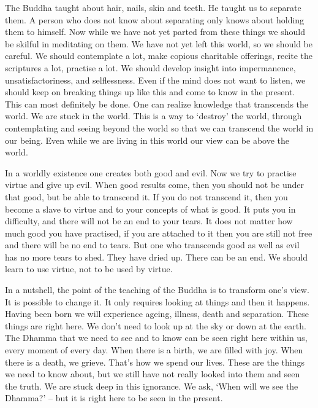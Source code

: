 The Buddha taught about hair, nails, skin and teeth. He taught us to separate them. A person who does not know about separating only knows about holding them to himself. Now while we have not yet parted from these things we should be skilful in meditating on them. We have not yet left this world, so we should be careful. We should contemplate a lot, make copious charitable offerings, recite the scriptures a lot, practise a lot. We should develop insight into impermanence, unsatisfactoriness, and selflessness. Even if the mind does not want to listen, we should keep on breaking things up like this and come to know in the present. This can most definitely be done. One can realize knowledge that transcends the world. We are stuck in the world. This is a way to `destroy' the world, through contemplating and seeing beyond the world so that we can transcend the world in our being. Even while we are living in this world our view can be above the world. 

In a worldly existence one creates both good and evil. Now we try to practise virtue and give up evil. When good results come, then you should not be under that good, but be able to transcend it. If you do not transcend it, then you become a slave to virtue and to your concepts of what is good. It puts you in difficulty, and there will not be an end to your tears. It does not matter how much good you have practised, if you are attached to it then you are still not free and there will be no end to tears. But one who transcends good as well as evil has no more tears to shed. They have dried up. There can be an end. We should learn to use virtue, not to be used by virtue. 

In a nutshell, the point of the teaching of the Buddha is to transform one's view. It is possible to change it. It only requires looking at things and then it happens. Having been born we will experience ageing, illness, death and separation. These things are right here. We don't need to look up at the sky or down at the earth. The Dhamma that we need to see and to know can be seen right here within us, every moment of every day. When there is a birth, we are filled with joy. When there is a death, we grieve. That's how we spend our lives. These are the things we need to know about, but we still have not really looked into them and seen the truth. We are stuck deep in this ignorance. We ask, `When will we see the Dhamma?' -- but it is right here to be seen in the present. 

